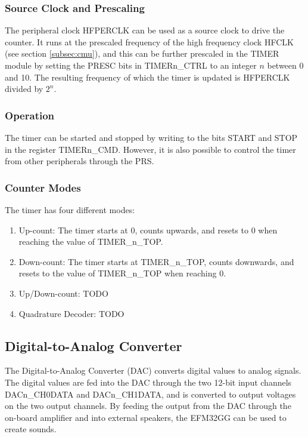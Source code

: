 \subsubsection{Source Clock and Prescaling} The peripheral clock HFPERCLK can be used as a source clock to drive the counter. It runs at the prescaled frequency of the high frequency clock HFCLK (see section \ref{subsec:cmu}), and this can be further prescaled in the TIMER module by setting the PRESC bits in TIMERn\_CTRL to an integer $n$ between 0 and 10. The resulting frequency of which the timer is updated is HFPERCLK divided by $2^{n}$.

\subsubsection{Operation}
The timer can be started and stopped by writing to the bits START and STOP in the register TIMERn\_CMD. However, it is also possible to control the timer from other peripherals through the PRS.

\subsubsection{Counter Modes}
The timer has four different modes:
\begin{enumerate}
	\item Up-count: The timer starts at 0, counts upwards, and resets to 0 when reaching the value of TIMER\_n\_TOP.
	\item Down-count: The timer starts at TIMER\_n\_TOP, counts downwards, and resets to the value of TIMER\_n\_TOP when reaching 0.

	\item Up/Down-count: TODO %
	\item Quadrature Decoder: TODO %
\end{enumerate}


\subsection{Digital-to-Analog Converter}

The Digital-to-Analog Converter (DAC) converts digital values to analog signals. The digital values are fed into the DAC through the two 12-bit input channels DACn\_CH0DATA and DACn\_CH1DATA, and is converted to output voltages on the two output channels. By feeding the output from the DAC through the on-board amplifier and into external speakers, the EFM32GG can be used to create sounds.

